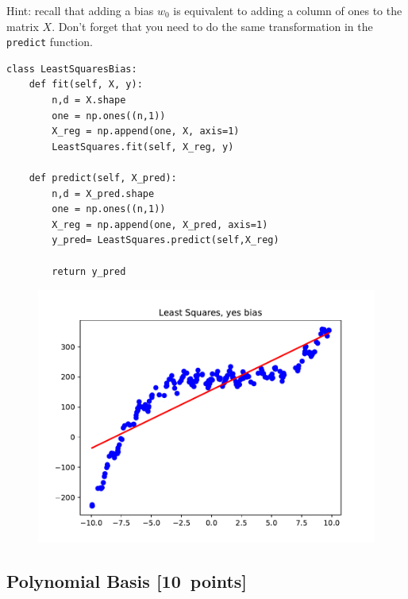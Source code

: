 \documentclass{article}
\newcommand\pts[1]{\textcolor{pointscolour}{[#1~points]}}
\begin{document}
Hint: recall that adding a bias $w_0$ is equivalent to adding a column of ones to the matrix $X$. Don't forget that you need to do the same transformation in the \texttt{predict} function.

\begin{verbatim}
class LeastSquaresBias:
    def fit(self, X, y):
        n,d = X.shape
        one = np.ones((n,1))
        X_reg = np.append(one, X, axis=1)
        LeastSquares.fit(self, X_reg, y)

    def predict(self, X_pred):
        n,d = X_pred.shape
        one = np.ones((n,1))
        X_reg = np.append(one, X_pred, axis=1)
        y_pred= LeastSquares.predict(self,X_reg)

        return y_pred
\end{verbatim}

\begin{figure}
	\centering
	\includegraphics[width = .7\textwidth]{figs/least_squares_yes_bias.pdf}
\end{figure}

\subsection{Polynomial Basis \pts{10}}
\end{document}
